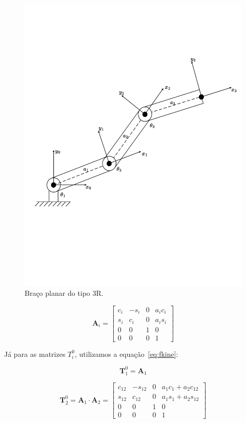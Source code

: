 \begin{figure}
    \centering
    \includegraphics[width=0.8\linewidth]{Images/3r-planar.pdf}
    \caption{Braço planar do tipo 3R.}\label{fig:3r-planar-arm}
\end{figure}

\begin{equation}
    \mathbf{A}_i = \begin{bmatrix}
        c_i & -s_i & 0 & a_i c_i \\
        s_i & c_i  & 0 & a_i s_i \\
        0   & 0    & 1 & 0       \\
        0   & 0    & 0 & 1
    \end{bmatrix}
\end{equation}

Já para as matrizes \(T^0_i\), utilizamos a equação~\ref{eq:fkine}:

\begin{equation}
    \mathbf{T}^0_1 = \mathbf{A}_1
\end{equation}

\begin{equation}
    \mathbf{T}^0_2 = \mathbf{A}_1 \cdot \mathbf{A}_2 = \begin{bmatrix}
        c_{12} & -s_{12} & 0 & a_1c_1 + a_2c_{12} \\
        s_{12} & c_{12}  & 0 & a_1s_1 + a_2s_{12} \\
        0      & 0       & 1 & 0                  \\
        0      & 0       & 0 & 1
    \end{bmatrix}
\end{equation}

